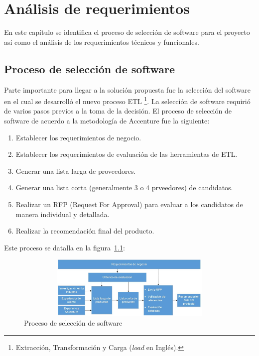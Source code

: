 \chapter{Análisis de requerimientos}
\label{cap:analisis}

En este capítulo se identifica el proceso de selección de software para el proyecto así como el análisis de los requerimientos técnicos y funcionales.

\section{Proceso de selección de software}

Parte importante para llegar a la solución propuesta fue la selección del
software en el cual se desarrolló el nuevo proceso ETL \footnote{Extracción,
  Transformación y Carga (\emph{load} en Inglés).}. La selección de software
requirió de varios pasos previos a la toma de la decisión. El proceso de
selección de software de acuerdo a la metodología de Accenture fue la siguiente:

\begin{enumerate}
\item Establecer los requerimientos de negocio.
\item Establecer los requerimientos de evaluación de las herramientas de ETL.
\item Generar una lista larga de proveedores.
\item Generar una lista corta (generalmente 3 o 4 prveedores) de candidatos.
\item Realizar  un RFP (Request For  Approval) para evaluar a  los candidatos de
  manera individual y detallada.
\item Realizar la recomendación final del producto.
\end{enumerate}

Este proceso se datalla en la figura~\ref{fig:proceso}:

\begin{figure}[htb]
  \begin{center}
    \includegraphics[width=12cm, height=3cm, scale=0.5]{Proceso_seleccion_software.jpg}
    \caption{Proceso de selección de software}
    \label{fig:proceso}
  \end{center}
\end{figure}

